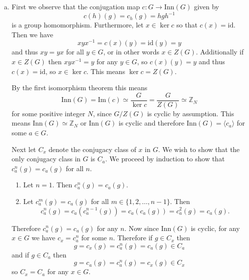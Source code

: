 \documentclass{article}
\begin{document}
\begin{Answer}
\begin{enumerate}[(a)]
  \item{
    First we observe that the conjugation map
    $c : G \to \mathrm{Inn}(G)$ given by
    $$
    c(h)(g) = c_h(g) = h g h^{-1}
    $$
    is a group homomorphism.
    Furthermore, let $x \in \ker c$ so that
    $c(x) = \mathrm{id}$.
    Then we have
    $$
    x y x^{-1} = c(x)(y) = \mathrm{id}(y) = y
    $$
    and thus $x y = y x$ for all $y \in G$, or in other words $x \in
    Z(G)$. Additionally if $x \in Z(G)$ then $xyx^{-1} = y$ for any
    $y \in G$, so $c(x)(y) = y$ and thus $c(x) = \mathrm{id}$, so
    $x \in \ker c$. This means $\ker c = Z(G)$.

    By the first isomorphism theorem this means
    $$
    \mathrm{Inn}(G)
  = \mathrm{Im}(c)
  \simeq \frac{G}{\ker c}
  = \frac{G}{Z(G)}
  \simeq \mathbb{Z}_N
    $$
    for some positive integer $N$, since $G / Z(G)$ is cyclic by
    assumption. This means $\mathrm{Inn}(G) \simeq \mathbb{Z}_N$ or
    $\mathrm{Inn}(G)$ is cyclic and therefore
    $\mathrm{Inn}(G) = \langle c_a \rangle$ for some $a \in G$.

    Next let $C_x$ denote the conjugacy class of $x$ in $G$.
    We wish to show that the only conjugacy class in $G$
    is $C_a$. We proceed by induction to show that
    $c_a^n(g) = c_a(g)$ for all $n$.
    \begin{enumerate}
      \item{
        Let $n = 1$. Then $c_a^n(g) = c_a(g)$.
      }
      \item{
        Let $c_a^m(g) = c_a(g)$ for all
        $m \in \{ 1, 2, \dots, n-1 \}$. Then
        $$
        c_a^n(g) = c_a(c_a^{n-1}(g)) = c_a(c_a(g)) = c_a^2(g) = c_a(g).
        $$
      }
    \end{enumerate}
    Therefore $c_a^n(g) = c_a(g)$ for any $n$. Now since
    $\mathrm{Inn}(G)$ is cyclic, for any $x \in G$ we have
    $c_x = c_a^n$ for some $n$. Therefore if $g \in C_x$ then
    $$
    g = c_x(g) = c_a^n(g) = c_a(g) \in C_a
    $$
    and if $g \in C_a$ then
    $$
    g = c_a(g) = c_a^n(g) = c_x(g) \in C_x
    $$
    so $C_x = C_a$ for any $x \in G$.

}
\end{enumerate}
\end{Answer}
\end{document}
